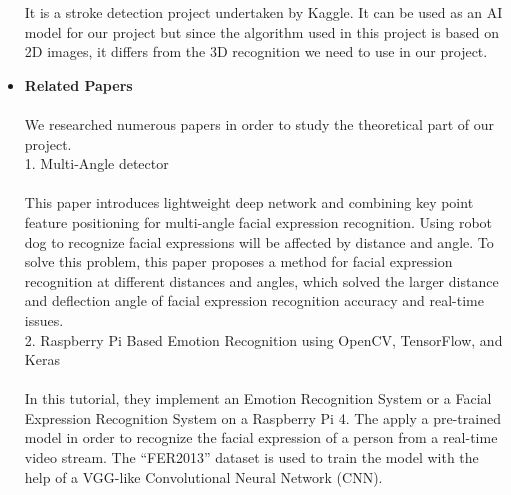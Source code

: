 \begin{itemize}
    It is a stroke detection project undertaken by Kaggle. It can be used as an AI model for our project but since the algorithm used in this project is based on 2D images, it differs from the 3D recognition we need to use in our project.\\
    \item \textbf{Related Papers}\\
    \\We researched numerous papers in order to study the theoretical part of our project.\\ 

    1. Multi-Angle detector\cite{r15}\\
    \\This paper introduces lightweight deep network and combining key point feature positioning for multi-angle facial expression recognition. Using robot dog to recognize facial expressions will be affected by distance and angle. To solve this problem, this paper proposes a method for facial expression recognition at different distances and angles, which solved the larger distance and deflection angle of facial expression recognition accuracy and real-time issues.\\

    2. Raspberry Pi Based Emotion Recognition using OpenCV, TensorFlow, and Keras \cite{r16}\\
    \\In this tutorial, they implement an Emotion Recognition System or a Facial Expression Recognition System on a Raspberry Pi 4. The apply a pre-trained model in order to recognize the facial expression of a person from a real-time video stream. The “FER2013” dataset is used to train the model with the help of a VGG-like Convolutional Neural Network (CNN).\\


\end{itemize}
